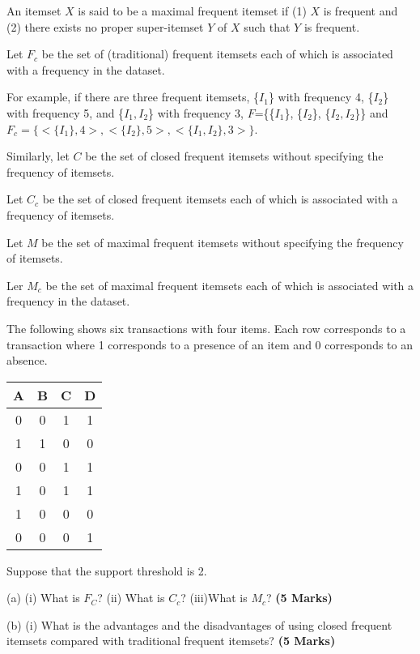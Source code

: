 \documentclass[en,black,normal,10pt]{elegantnote}
\begin{document}
An itemset $X$ is said to be a maximal frequent itemset
if (1) $X$ is frequent
and (2) there exists no proper super-itemset $Y$ of $X$ such that $Y$ is frequent.

Let $F_c$ be the set of (traditional) frequent itemsets each of which is associated with a frequency in the dataset.

For example, if there are three frequent itemsets, \{$I_1$\} with frequency 4,
\{$I_2$\} with frequency 5, and \{$I_1, I_2$\} with frequency 3,
$F$=\{\{$I_1$\}, \{$I_2$\}, \{$I_2, I_2$\}\}
and $F_c = \{<\{I_1\}, 4>, <\{I_2\}, 5>, <\{I_1, I_2\}, 3>\}$.

Similarly, let $C$ be the set of closed frequent itemsets without specifying the frequency of itemsets.

Let $C_c$ be the set of closed frequent itemsets each of which is associated with a frequency of itemsets.

Let $M$ be the set of maximal frequent itemsets without specifying the frequency of itemsets.

Ler $M_c$ be the set of maximal frequent itemsets each of which is associated with a frequency in the dataset.

The following shows six transactions with four items.
Each row corresponds to a transaction where 1 corresponds to a presence of an item and 0 corresponds to an absence.

\begin{tabular}{|c|c|c|c|}
  \hline
    \rowcolor{Gray} %
    A & B & C & D \\
    \hline
    0 & 0 & 1 & 1 \\
    \hline
    1 & 1 & 0 & 0 \\
    \hline
    0 & 0 & 1 & 1 \\
    \hline
    1 & 0 & 1 & 1 \\
    \hline
    1 & 0 & 0 & 0 \\
    \hline
    0 & 0 & 0 & 1 \\
    \hline
\end{tabular}

Suppose that the support threshold is 2.

(a) (i) What is $F_C$? \hspace{1cm} (ii) What is $C_c$? \hspace{1cm} (iii)What is $M_c$? \textbf{(5 Marks)}

(b) (i) What is the advantages and the disadvantages of using closed frequent itemsets compared with traditional frequent itemsets? \textbf{(5 Marks)}
\end{document}

